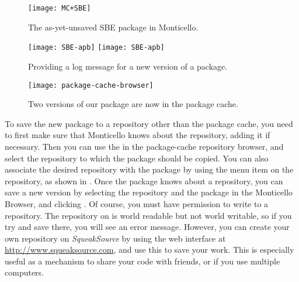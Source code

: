 \documentclass[a4paper,10pt,twoside]{book}
\begin{document}
\begin{figure}[tbp]
	\begin{center}
		\texttt{[image: MC+SBE]}
	\end{center}
	\caption{The as-yet-unsaved SBE package in Monticello.}
	\label{fig:MC+SBE}
\end{figure}

\begin{figure}[tbp]
	\begin{center}
	\ifluluelse
		{\texttt{[image: SBE-apb]}}
		{\texttt{[image: SBE-apb]}}
	\end{center}
	\caption{Providing a log message for a new version of a package.}
	\label{fig:SBE-apb}
\end{figure}

\begin{figure}[tbp]
	\begin{center}
	\texttt{[image: package-cache-browser]}
	\end{center}
	\caption{Two versions of our package are now in the package cache.}
	\label{fig:package-cache-browser}
\end{figure}

To save the new package to a repository other than the package cache, you need to first make sure that Monticello knows about the repository, adding it if necessary.  
Then you can use the  in the package-cache repository browser, and select the repository to which the package should be copied.  
You can also associate the desired repository with the package by using the  menu item  on the repository, as shown in .  
Once the package knows about a repository, you can save a new version by selecting the repository and the package in the Monticello Browser, and clicking .  
Of course, you must have permission to write to a repository.  
The  repository on  is world readable but not world writable, so if you try and save there, you will see an error message.  
However, you can create your own repository on \emph{SqueakSource} by using the web interface at \url{http://www.squeaksource.com}, and use this to save your work. 
This is especially useful as a mechanism to share your code with friends, or if you use multiple computers.
\end{document}
